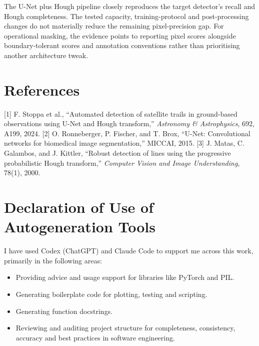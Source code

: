 \documentclass[10pt,a4paper,twocolumn]{article}
\begin{document}
The U-Net plus Hough pipeline closely reproduces the target detector's recall
and Hough completeness. The tested capacity, training-protocol and
post-processing changes do not materially reduce the remaining pixel-precision
gap. For operational masking, the evidence points to reporting pixel
scores alongside boundary-tolerant scores and annotation conventions rather than
prioritising another architecture tweak.

\section*{References}
{\footnotesize
[1] F. Stoppa et al., ``Automated detection of satellite trails in ground-based
observations using U-Net and Hough transform,'' \emph{Astronomy \& Astrophysics},
692, A199, 2024.
[2] O. Ronneberger, P. Fischer, and T. Brox, ``U-Net: Convolutional networks for
biomedical image segmentation,'' MICCAI, 2015.
[3] J. Matas, C. Galambos, and J. Kittler, ``Robust detection of lines using the
progressive probabilistic Hough transform,'' \emph{Computer Vision and Image
Understanding}, 78(1), 2000.
}

\section*{Declaration of Use of Autogeneration Tools}
{\footnotesize
I have used Codex (ChatGPT) and Claude Code to support me across this work,
primarily in the following areas:
\begin{itemize}
  \item Providing advice and usage support for libraries like PyTorch and PIL.
  \item Generating boilerplate code for plotting, testing and scripting.
  \item Generating function docstrings.
  \item Reviewing and auditing project structure for completeness, consistency,
        accuracy and best practices in software engineering.
\end{itemize}
}
\end{document}
